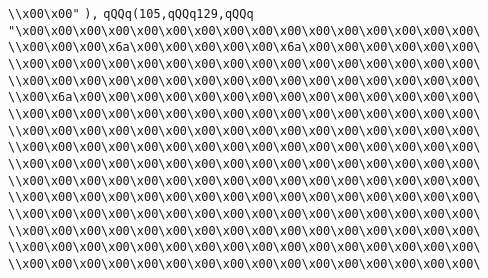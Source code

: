 \verb|\\x00\x00"|\newline
\verb|),|\newline
\verb|qQQq(105,qQQq129,qQQq|\newline
\verb|"\x00\x00\x00\x00\x00\x00\x00\x00\x00\x00\x00\x00\x00\x00\x00\x00\|\newline
\verb|\\x00\x00\x00\x6a\x00\x00\x00\x00\x00\x6a\x00\x00\x00\x00\x00\x00\|\newline
\verb|\\x00\x00\x00\x00\x00\x00\x00\x00\x00\x00\x00\x00\x00\x00\x00\x00\|\newline
\verb|\\x00\x00\x00\x00\x00\x00\x00\x00\x00\x00\x00\x00\x00\x00\x00\x00\|\newline
\verb|\\x00\x6a\x00\x00\x00\x00\x00\x00\x00\x00\x00\x00\x00\x00\x00\x00\|\newline
\verb|\\x00\x00\x00\x00\x00\x00\x00\x00\x00\x00\x00\x00\x00\x00\x00\x00\|\newline
\verb|\\x00\x00\x00\x00\x00\x00\x00\x00\x00\x00\x00\x00\x00\x00\x00\x00\|\newline
\verb|\\x00\x00\x00\x00\x00\x00\x00\x00\x00\x00\x00\x00\x00\x00\x00\x00\|\newline
\verb|\\x00\x00\x00\x00\x00\x00\x00\x00\x00\x00\x00\x00\x00\x00\x00\x00\|\newline
\verb|\\x00\x00\x00\x00\x00\x00\x00\x00\x00\x00\x00\x00\x00\x00\x00\x00\|\newline
\verb|\\x00\x00\x00\x00\x00\x00\x00\x00\x00\x00\x00\x00\x00\x00\x00\x00\|\newline
\verb|\\x00\x00\x00\x00\x00\x00\x00\x00\x00\x00\x00\x00\x00\x00\x00\x00\|\newline
\verb|\\x00\x00\x00\x00\x00\x00\x00\x00\x00\x00\x00\x00\x00\x00\x00\x00\|\newline
\verb|\\x00\x00\x00\x00\x00\x00\x00\x00\x00\x00\x00\x00\x00\x00\x00\x00\|\newline
\verb|\\x00\x00\x00\x00\x00\x00\x00\x00\x00\x00\x00\x00\x00\x00\x00\x00\|\newline
